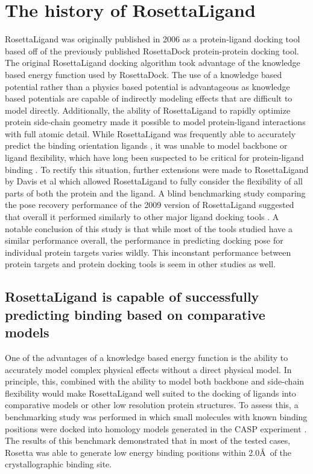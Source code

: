 \section{The history of RosettaLigand}
RosettaLigand was originally published in 2006 \citep{Meiler:2006vj} as a protein-ligand docking tool based off of the previously published RosettaDock \citep{Gray:2003uk} protein-protein docking tool.
The original RosettaLigand docking algorithm took advantage of the knowledge based energy function used by RosettaDock.
The use of a knowledge based potential rather than a physics based potential is advantageous as knowledge based potentials are capable of indirectly modeling effects that are difficult to model directly. %
Additionally, the ability of RosettaLigand to rapidly optimize protein side-chain geometry \citep{Barth:2007cw} made it possible to model protein-ligand interactions with full atomic detail.
While RosettaLigand was frequently able to accurately predict the binding orientation ligands \citep{Meiler:2006vj}, it was unable to model backbone or ligand flexibility, which have long been suspected to be critical for protein-ligand binding \citep{Yang:2014dm,KOSHLAND:1958wa}.
To rectify this situation, further extensions were made to RosettaLigand by Davis et al \citep{Davis:2009bf} which allowed RosettaLigand to fully consider the flexibility of all parts of both the protein and the ligand.
A blind benchmarking study comparing the pose recovery performance of the 2009 version of RosettaLigand suggested that overall it performed similarly to other major ligand docking tools \citep{Davis:2009fx}.
A notable conclusion of this study is that while most of the tools studied have a similar performance overall, the performance in predicting docking pose for individual protein targets varies wildly.
This inconstant performance between protein targets and protein docking tools is seem in other studies as well. 

\subsection{RosettaLigand is capable of successfully predicting binding based on comparative models}
One of the advantages of a knowledge based energy function is the ability to accurately model complex physical effects without a direct physical model.
In principle, this, combined with the ability to model both backbone and side-chain flexibility would make RosettaLigand well suited to the docking of ligands into comparative models or other low resolution protein structures. 
To assess this, a benchmarking study was performed in which small molecules with known binding positions were docked into homology models generated in the \ac{CASP} experiment \citep{Kaufmann:2012ck}.
The results of this benchmark demonstrated that in most of the tested cases, Rosetta was able to generate low energy binding positions within 2.0\AA\ of the crystallographic binding site.

